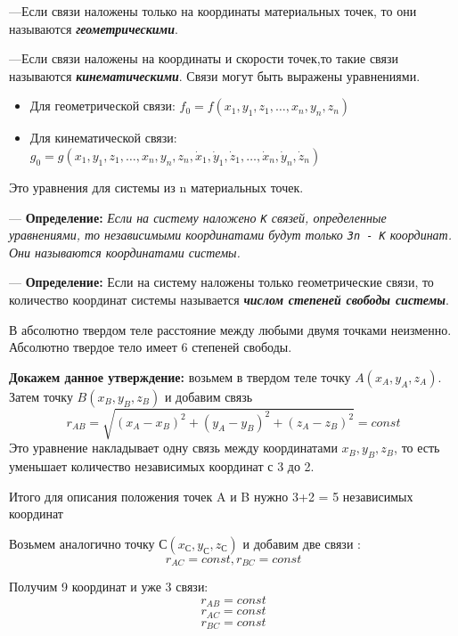\documentclass[12pt,a4paper]{report}
\begin{document}
---Если связи наложены только на координаты материальных точек, то они называются \textbf{\textit{геометрическими}}.

\vspace{5px}

---Если связи наложены на координаты и скорости точек,то такие связи называются \textbf{\textit{кинематическими}}. Связи могут быть выражены уравнениями.
\begin{itemize}
    \item Для геометрической связи: $f_0 = f(x_1,y_1,z_1, \dots , x_n, y_n, z_n)$
    \item Для кинематической связи: $g_0 = g(x_1,y_1,z_1, \dots , x_n, y_n, z_n, \dot x_1,\dot y_1,\dot z_1, \dots , \dot x_n, \dot y_n,\dot z_n)$
\end{itemize}
Это уравнения для системы из n материальных точек.

\vspace{5px}

--- \textbf{Определение:} \textit{Если на систему наложено \texttt{К} связей, определенные уравнениями, то независимыми координатами будут только \texttt{3n - K} координат. Они называются координатами системы.}

\vspace{5px}

--- \textbf{Определение:} Если на систему наложены только геометрические связи, то количество координат системы называется \textbf{\textit{числом степеней свободы системы}}.

\vspace{5px}

В абсолютно твердом теле расстояние между любыми двумя точками неизменно. Абсолютно твердое тело имеет 6 степеней свободы.

\vspace{6px}

\textbf{Докажем данное утверждение:} возьмем в твердом теле точку $ A(x_A,y_A,z_A)$. Затем точку $ B(x_{B},y_{B},z_{B})$ и добавим связь \[ r_{AB} = \sqrt{(x_A-x_B)^2 + (y_A-y_B)^2 + (z_A-z_B)^2} = const \]
Это уравнение накладывает одну связь между координатами $x_B, y_B,z_B$, то есть уменьшает количество независимых координат с 3 до 2.

Итого для описания положения точек A и B нужно 3+2 = 5 независимых координат

Возьмем аналогично точку $ С(x_{С},y_{С},z_{С})$ и добавим две связи : \[ r_{AC} = const, r_{BC} = const \]

Получим 9 координат и уже 3 связи:
\[r_{AB} = const\]
\[r_{AC} = const\]
\[r_{BC} = const\]
\end{document}

